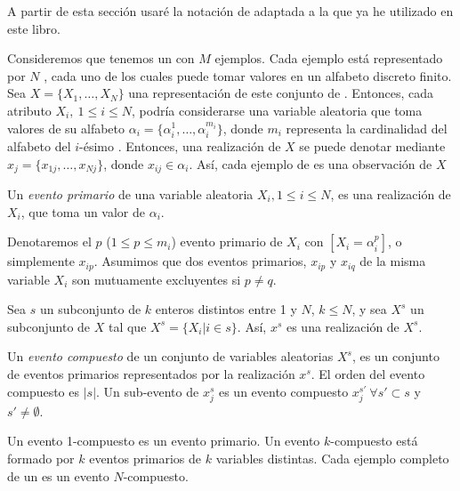 \ABIERTO
\clearpage
A partir de esta sección usaré la notación de \citet{WangWong-FromAssociationToClassificationInferenceUsingWeightOfEvidence-2003} adaptada a la que ya he utilizado en este libro.


Consideremos que tenemos un \dataset \D con $M$ ejemplos. Cada ejemplo está representado por $N$ \atributos, cada uno de los cuales puede tomar valores en un alfabeto discreto finito. Sea $X = \{X_1,\ldots,X_N\}$ una representación de este conjunto de \atributos. Entonces, cada atributo $X_i,\ 1\leq i\leq N$, podría considerarse una variable aleatoria que toma valores de su alfabeto $\alpha_i = \{\alpha_i^1,\ldots,\alpha_i^{m_i}\}$, donde $m_i$ representa la cardinalidad del alfabeto del $i$-ésimo \atributo. Entonces, una realización de $X$ se puede denotar mediante $x_j = \{x_{1j},\ldots,x_{Nj}\}$, donde $x_{ij} \in \alpha_i$. Así, cada ejemplo de \D es una observación de $X$

\begin{Definition}
   Un \emph{evento primario} de una variable aleatoria $X_i, 1\leq i\leq N$, es una realización de $X_i$, que toma un valor de $\alpha_i$.
\label{def:evento-primario}
\end{Definition}

Denotaremos el $p$ ($1\leq p\leq m_i$) evento primario de $X_i$ con $[X_i = \alpha_i^p]$, o simplemente $x_{ip}$. Asumimos que dos eventos primarios, $x_{ip}$ y $x_{iq}$ de la misma variable $X_i$ son mutuamente excluyentes si $p\neq q$.

Sea $s$ un subconjunto de $k$ enteros distintos entre 1 y $N$, $k\leq N$, y sea $X^s$ un subconjunto de $X$ tal que $X^s = \{X_i | i\in s\}$. Así, $x^s$ es una realización de $X^s$.

\begin{Definition}
   Un \emph{evento compuesto} de un conjunto de variables aleatorias $X^s$, es un conjunto de eventos primarios representados por la realización $x^s$. El orden del evento compuesto es $|s|$. Un sub-evento de $x_j^s$ es un evento compuesto $x_j^{s'}\ \forall s'\subset s$ y $s'\neq\emptyset$.
\label{def:evento-compuesto}
\end{Definition}

Un evento 1-compuesto es un evento primario. Un evento $k$-compuesto está formado por $k$ eventos primarios de $k$ variables distintas. Cada ejemplo completo de un \dataset es un evento $N$-compuesto.

